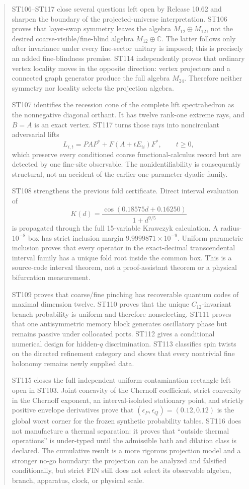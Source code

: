 \documentclass[11pt,a4paper]{article}
\begin{document}
\begin{abstract}
ST106--ST117 close several questions left open by Release 10.62 and sharpen the boundary of the projected-universe interpretation. ST106 proves that layer-swap symmetry leaves the algebra $M_{12}\oplus M_{12}$, not the desired coarse-visible/fine-blind algebra $M_{12}\oplus\mathbb C$. The latter follows only after invariance under every fine-sector unitary is imposed; this is precisely an added fine-blindness premise. ST114 independently proves that ordinary vertex locality moves in the opposite direction: vertex projectors and a connected graph generator produce the full algebra $M_{24}$. Therefore neither symmetry nor locality selects the projection algebra.

ST107 identifies the recession cone of the complete lift spectrahedron as the nonnegative diagonal orthant. It has twelve rank-one extreme rays, and $B=A$ is an exact vertex. ST117 turns those rays into noncirculant adversarial lifts
\[
L_{i,t}=PAP^*+F(A+tE_{ii})F^*,\qquad t\ge0,
\]
which preserve every conditioned coarse functional-calculus record but are detected by one fine-site observable. The nonidentifiability is consequently structural, not an accident of the earlier one-parameter dyadic family.

ST108 strengthens the previous fold certificate. Direct interval evaluation of
\[
K(d)=\frac{\cos(0.18575d+0.16250)}{1+d^{9/5}}
\]
is propagated through the full 15-variable Krawczyk calculation. A radius-$10^{-8}$ box has strict inclusion margin $9.9999871\times10^{-9}$. Uniform parametric inclusion proves that every operator in the exact-decimal transcendental interval family has a unique fold root inside the common box. This is a source-code interval theorem, not a proof-assistant theorem or a physical bifurcation measurement.

ST109 proves that coarse/fine pinching has recoverable quantum codes of maximal dimension twelve. ST110 proves that the unique $C_{12}$-invariant branch probability is uniform and therefore nonselecting. ST111 proves that one antisymmetric memory block generates oscillatory phase but remains passive under collocated ports. ST112 gives a conditional numerical design for hidden-$q$ discrimination. ST113 classifies spin twists on the directed refinement category and shows that every nontrivial fine holonomy remains newly supplied data.

ST115 closes the full independent uniform-contamination rectangle left open in ST103. Joint concavity of the Chernoff coefficient, strict convexity in the Chernoff exponent, an interval-isolated stationary point, and strictly positive envelope derivatives prove that $(\epsilon_P,\epsilon_Q)=(0.12,0.12)$ is the global worst corner for the frozen synthetic probability tables. ST116 does not manufacture a thermal separation: it proves that ``outside thermal operations'' is under-typed until the admissible bath and dilation class is declared. The cumulative result is a more rigorous projection model and a stronger no-go boundary: the projection can be analyzed and falsified conditionally, but strict FIN still does not select its observable algebra, branch, apparatus, clock, or physical scale.
\end{abstract}
\end{document}
